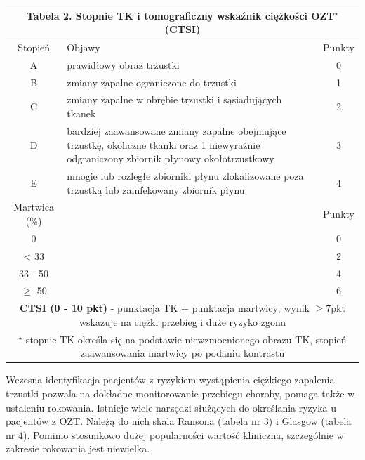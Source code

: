 \documentclass[a4paper, 12pt]{report}
\begin{document}
\begin{table}[htbp]
\begin{center}
\begin{footnotesize}
\begin{tabular}{|c p{9cm} c|}
\hline
\multicolumn{3}{|c|}{\cellcolor[gray]{0.9} \textbf{Tabela 2. Stopnie TK i tomograficzny
  wskaźnik ciężkości OZT$^\star$ (CTSI)}}\\
\hline \hline
Stopień & Objawy & Punkty\\
\hline \hline
A & prawidłowy obraz trzustki & 0\\
\hline
B & zmiany zapalne ograniczone do trzustki & 1\\
\hline
C & zmiany zapalne w obrębie trzustki i sąsiadujących tkanek & 2\\
\hline
D & bardziej zaawansowane zmiany zapalne obejmujące trzustkę,
    okoliczne tkanki oraz 1 niewyraźnie odgraniczony zbiornik płynowy
    okołotrzustkowy & 3\\
\hline
E & mnogie lub rozległe zbiorniki płynu zlokalizowane poza trzustką
    lub zainfekowany zbiornik płynu & 4\\
\hline \hline
Martwica (\%) & & Punkty\\
\hline \hline
0 & & 0\\
< 33 & & 2\\
33 - 50 & & 4\\
$\geq$ 50 & & 6\\
\hline \hline
\multicolumn {3}{|p{13cm}|}{\textbf{CTSI (0 - 10 pkt)} - punktacja TK + punktacja
  martwicy; wynik $\geq$7pkt wskazuje na ciężki przebieg i duże ryzyko
  zgonu}\\
\hline
\multicolumn {3}{|p{13cm}|}{\scriptsize{$^\star$ stopnie TK określa się
  na podstawie niewzmocnionego obrazu TK, stopień zaawansowania martwicy po podaniu
  kontrastu}}\\
\hline
\end{tabular}
\end{footnotesize}
\end{center}
\end{table}

Wczesna identyfikacja pacjentów z ryzykiem wystąpienia ciężkiego
zapalenia trzustki pozwala na dokładne monitorowanie przebiegu
choroby, pomaga także w ustaleniu rokowania. Istnieje wiele narzędzi
służących do określania ryzyka u pacjentów z OZT. Należą do nich skala
Ransona (tabela nr 3) i Glasgow (tabela nr 4). Pomimo stosunkowo dużej
popularności wartość kliniczna, szczególnie w zakresie rokowania jest
niewielka.
\end{document}

